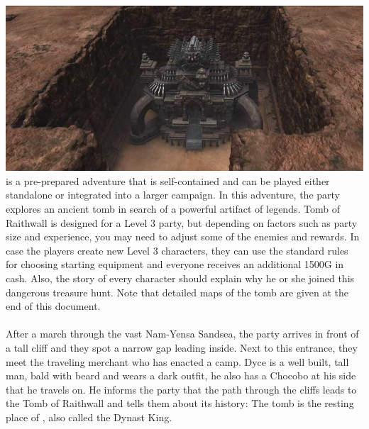 %
\\\\
%
\includegraphics[width=\columnwidth]{./art/tombofraithwall/tomb1.jpg}
%
\ofpar
%
 is a pre-prepared adventure that is self-contained and can be played either standalone or integrated into a larger campaign.
In this adventure, the party explores an ancient tomb in search of a powerful artifact of legends.
Tomb of Raithwall is designed for a Level 3 party, but depending on factors such as party size and experience, you may need to adjust some of the enemies and rewards.
In case the players create new Level 3 characters, they can use the standard rules for choosing starting equipment and everyone receives an additional 1500G in cash.
Also, the story of every character should explain why he or she joined this dangerous treasure hunt.
Note that detailed maps of the tomb are given at the end of this document.
%
\ofpar
%
\\\\
%
After a march through the vast Nam-Yensa Sandsea, the party arrives in front of a tall cliff and they spot a narrow gap leading inside.
Next to this entrance, they meet the traveling merchant  who has enacted a camp.
Dyce is a well built, tall man, bald with beard and wears a dark outfit, he also has a Chocobo at his side that he travels on.
He informs the party that the path through the cliffs leads to the Tomb of Raithwall and tells them about its history:
The tomb is the resting place of , also called the Dynast King.
